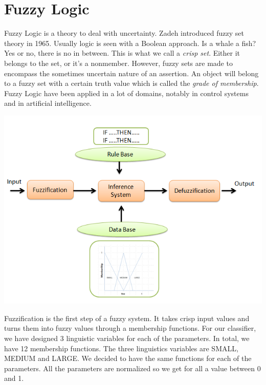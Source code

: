\documentclass[a4paper,12pt]{article}
\begin{document}
\section{Fuzzy Logic}

Fuzzy Logic is a theory to deal with uncertainty.
Zadeh introduced fuzzy set theory in 1965. Usually logic is seen with a Boolean approach. Is a whale a fish? Yes or no, there is no in between. This is what we call a \textit{crisp set}. Either it belongs to the set, or it's a nonmember. 
However, fuzzy sets are made to encompass the sometimes uncertain nature of an assertion. An object will belong to a fuzzy set with a certain truth value which is called the \textit{grade of membership}.
Fuzzy Logic have been applied in a lot of domains, notably in control systems and in artificial intelligence.

\begin{center}
\includegraphics[scale=0.5]{fuzzysystem}
\end{center}

Fuzzification is the first step of a fuzzy system. It takes crisp input values and turns them into fuzzy values through a membership functions.
For our classifier, we have designed 3 linguistic variables for each of the parameters. In total, we have 12 membership functions.
The three linguistics variables are SMALL, MEDIUM and LARGE. We decided to have the same functions for each of the parameters.
All the parameters are normalized so we get for all a value between 0 and 1.
\end{document}
